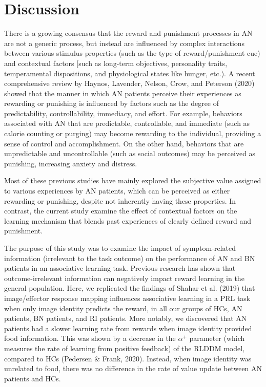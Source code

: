 \documentclass[
  man,floatsintext]{apa6}
\begin{document}
\hypertarget{discussion}{%
\section{Discussion}\label{discussion}}

There is a growing consensus that the reward and punishment processes in AN are not a generic process, but instead are influenced by complex interactions between various stimulus properties (such as the type of reward/punishment cue) and contextual factors {[}such as long-term objectives, personality traits, temperamental dispositions, and physiological states like hunger, etc.). A recent comprehensive review by Haynos, Lavender, Nelson, Crow, and Peterson (2020) showed that the manner in which AN patients perceive their experiences as rewarding or punishing is influenced by factors such as the degree of predictability, controllability, immediacy, and effort. For example, behaviors associated with AN that are predictable, controllable, and immediate (such as calorie counting or purging) may become rewarding to the individual, providing a sense of control and accomplishment. On the other hand, behaviors that are unpredictable and uncontrollable (such as social outcomes) may be perceived as punishing, increasing anxiety and distress.

Most of these previous studies have mainly explored the subjective value assigned to various experiences by AN patients, which can be perceived as either rewarding or punishing, despite not inherently having these properties. In contrast, the current study examine the effect of contextual factors on the learning mechanism that blends past experiences of clearly defined reward and punishment.

The purpose of this study was to examine the impact of symptom-related information (irrelevant to the task outcome) on the performance of AN and BN patients in an associative learning task. Previous research has shown that outcome-irrelevant information can negatively impact reward learning in the general population. Here, we replicated the findings of Shahar et al. (2019) that image/effector response mapping influences associative learning in a PRL task when only image identity predicts the reward, in all our groups of HCs, AN patients, BN patients, and RI patients. More notably, we discovered that AN patients had a slower learning rate from rewards when image identity provided food information. This was shown by a decrease in the \(\alpha^+\) parameter (which measures the rate of learning from positive feedback) of the RLDDM model, compared to HCs (Pedersen \& Frank, 2020). Instead, when image identity was unrelated to food, there was no difference in the rate of value update between AN patients and HCs.
\end{document}
